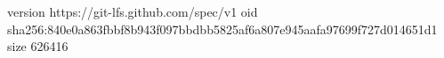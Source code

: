 version https://git-lfs.github.com/spec/v1
oid sha256:840e0a863fbbf8b943f097bbdbb5825af6a807e945aafa97699f727d014651d1
size 626416
